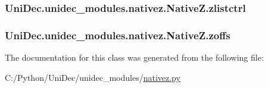 \subsubsection[{zlistctrl}]{\setlength{\rightskip}{0pt plus 5cm}Uni\+Dec.\+unidec\+\_\+modules.\+nativez.\+Native\+Z.\+zlistctrl}\label{class_uni_dec_1_1unidec__modules_1_1nativez_1_1_native_z_a93d22068db692131e1b973ec32f34b8c}
\hypertarget{class_uni_dec_1_1unidec__modules_1_1nativez_1_1_native_z_ac501c35f150a4c9fef0031e2108cf936}{}
\subsubsection[{zoffs}]{\setlength{\rightskip}{0pt plus 5cm}Uni\+Dec.\+unidec\+\_\+modules.\+nativez.\+Native\+Z.\+zoffs}\label{class_uni_dec_1_1unidec__modules_1_1nativez_1_1_native_z_ac501c35f150a4c9fef0031e2108cf936}


The documentation for this class was generated from the following file\+:\begin{DoxyCompactItemize}
\item 
C\+:/\+Python/\+Uni\+Dec/unidec\+\_\+modules/\hyperlink{nativez_8py}{nativez.\+py}\end{DoxyCompactItemize}
